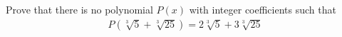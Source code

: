 
Prove that there is no polynomial $P(x)$ with integer coefficients such that
\begin{align*}
P(\sqrt[3]{5}+\sqrt[3]{25}) = 2\sqrt[3]{5} + 3\sqrt[3]{25}
\end{align*}

